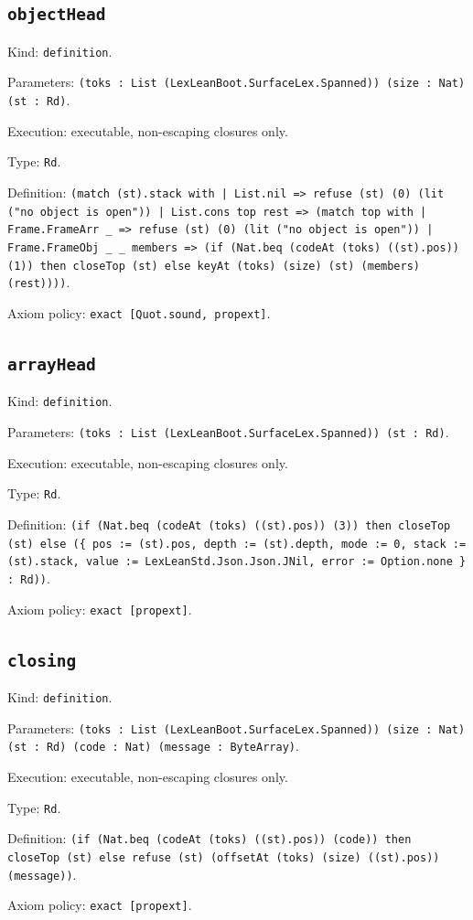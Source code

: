 \documentclass[11pt]{article}
\begin{document}
\subsection*{\texttt{objectHead}}
\noindent Kind: \texttt{definition}.\par
\noindent Parameters: \texttt{(toks : List (LexLeanBoot.SurfaceLex.Spanned)) (size : Nat) (st : Rd)}.\par
\noindent Execution: executable, non-escaping closures only.\par
\noindent Type: \texttt{Rd}.\par
\noindent Definition: \texttt{(match (st).stack with | List.nil => refuse (st) (0) (lit ("no object is open")) | List.cons top rest => (match top with | Frame.FrameArr \_ => refuse (st) (0) (lit ("no object is open")) | Frame.FrameObj \_ \_ members => (if (Nat.beq (codeAt (toks) ((st).pos)) (1)) then closeTop (st) else keyAt (toks) (size) (st) (members) (rest))))}.\par
\noindent Axiom policy: \texttt{exact [Quot.sound, propext]}.\par
\subsection*{\texttt{arrayHead}}
\noindent Kind: \texttt{definition}.\par
\noindent Parameters: \texttt{(toks : List (LexLeanBoot.SurfaceLex.Spanned)) (st : Rd)}.\par
\noindent Execution: executable, non-escaping closures only.\par
\noindent Type: \texttt{Rd}.\par
\noindent Definition: \texttt{(if (Nat.beq (codeAt (toks) ((st).pos)) (3)) then closeTop (st) else (\{ pos := (st).pos, depth := (st).depth, mode := 0, stack := (st).stack, value := LexLeanStd.Json.Json.JNil, error := Option.none \} : Rd))}.\par
\noindent Axiom policy: \texttt{exact [propext]}.\par
\subsection*{\texttt{closing}}
\noindent Kind: \texttt{definition}.\par
\noindent Parameters: \texttt{(toks : List (LexLeanBoot.SurfaceLex.Spanned)) (size : Nat) (st : Rd) (code : Nat) (message : ByteArray)}.\par
\noindent Execution: executable, non-escaping closures only.\par
\noindent Type: \texttt{Rd}.\par
\noindent Definition: \texttt{(if (Nat.beq (codeAt (toks) ((st).pos)) (code)) then closeTop (st) else refuse (st) (offsetAt (toks) (size) ((st).pos)) (message))}.\par
\noindent Axiom policy: \texttt{exact [propext]}.\par
\end{document}

